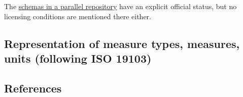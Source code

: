 \documentclass[
  11pt,
]{article}
\begin{document}
The
\href{https://github.com/ISO-TC211/schemas-isotc211.github.io}{schemas
in a parallel repository} have an explicit official status, but no
licensing conditions are mentioned there either.

\hypertarget{representation-of-measure-types-measures-units-following-iso-19103}{%
\subsection{Representation of measure types, measures, units (following
ISO
19103)}\label{representation-of-measure-types-measures-units-following-iso-19103}}

\hypertarget{references}{%
\subsection{References}\label{references}}
\end{document}
